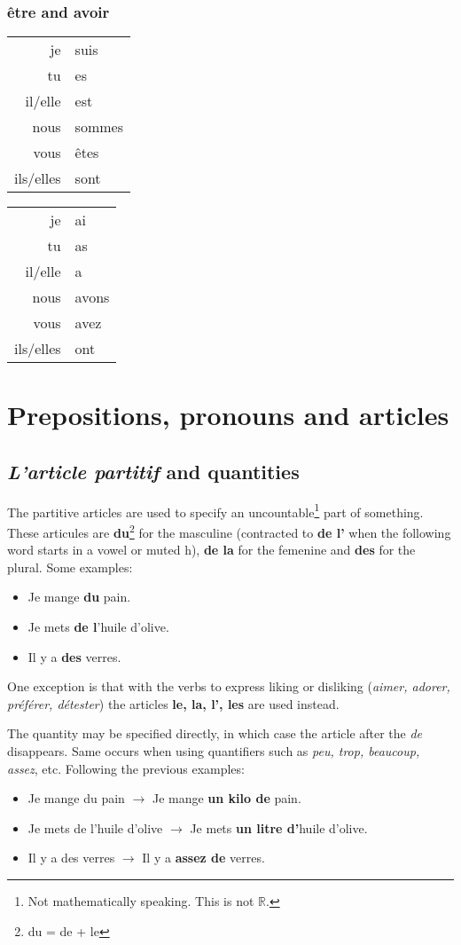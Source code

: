 \documentclass[palatino]{nicenotes}
\newcommand{\conjug}[6]{\begin{tabular}{rl}
je & #1 \\
tu & #2 \\
il/elle & #3 \\
nous & #4 \\
vous & #5 \\
ils/elles & #6 \\
\end{tabular}}
\begin{document}
\subsubsection{\^etre and avoir}


\begin{minipage}{0.45\textwidth}
\centering
\conjug
	{suis}
	{es}
	{est}
	{sommes}
	{\^etes}
	{sont}
\end{minipage}
\begin{minipage}{0.45\textwidth}
\centering
\conjug
	{ai}
	{as}
	{a}
	{avons}
	{avez}
	{ont}
\end{minipage}

\section{Prepositions, pronouns and articles}

\subsection{\textit{L'article partitif} and quantities}

The partitive articles are used to specify an uncountable\footnote{Not mathematically speaking. This is not $\mathbb{R}$.} part of something. These articules are \textbf{du}\footnote{du = de + le} for the masculine (contracted to \textbf{de l'} when the following word starts in a vowel or muted h), \textbf{de la} for the femenine and \textbf{des} for the plural. Some examples:

\begin{itemize}
\item Je mange \textbf{du} pain.
\item Je mets \textbf{de l}'huile d'olive.
\item Il y a \textbf{des} verres.
\end{itemize}

One exception is that with the verbs to express liking or disliking (\textit{aimer, adorer, préférer, détester}) the articles \textbf{le, la, l', les} are used instead.

The quantity may be specified directly, in which case the article after the \textit{de} disappears. Same occurs when using quantifiers such as \textit{peu, trop, beaucoup, assez}, etc. Following the previous examples:

\begin{itemize}
\item Je mange du pain $\to$ Je mange \textbf{un kilo de} pain.
\item Je mets de l'huile d'olive $\to$ Je mets \textbf{un litre d'}huile d'olive.
\item Il y a des verres $\to$ Il y a \textbf{assez de} verres.
\end{itemize}
\end{document}
